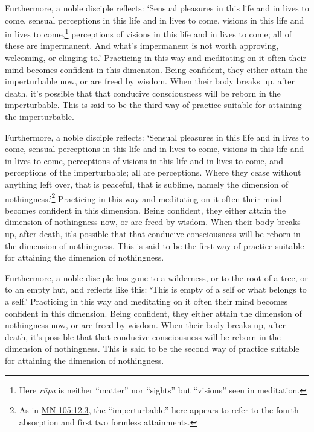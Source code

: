 \documentclass[12pt,openany]{book}%
\begin{document}
Furthermore, a noble disciple reflects: ‘Sensual pleasures in this life and in lives to come, sensual perceptions in this life and in lives to come, visions in this life and in lives to come,\footnote{Here \textit{\textsanskrit{rūpa}} is neither “matter” nor “sights” but “visions” seen in meditation. } perceptions of visions in this life and in lives to come; all of these are impermanent. And what’s impermanent is not worth approving, welcoming, or clinging to.’ Practicing in this way and meditating on it often their mind becomes confident in this dimension. Being confident, they either attain the imperturbable now, or are freed by wisdom. When their body breaks up, after death, it’s possible that that conducive consciousness will be reborn in the imperturbable. This is said to be the third way of practice suitable for attaining the imperturbable. 

Furthermore, a noble disciple reflects: ‘Sensual pleasures in this life and in lives to come, sensual perceptions in this life and in lives to come, visions in this life and in lives to come, perceptions of visions in this life and in lives to come, and perceptions of the imperturbable; all are perceptions. Where they cease without anything left over, that is peaceful, that is sublime, namely the dimension of nothingness.’\footnote{As in \href{https://suttacentral.net/mn105/en/sujato\#12.3}{MN 105:12.3}, the “imperturbable” here appears to refer to the fourth absorption and first two formless attainments. } Practicing in this way and meditating on it often their mind becomes confident in this dimension. Being confident, they either attain the dimension of nothingness now, or are freed by wisdom. When their body breaks up, after death, it’s possible that that conducive consciousness will be reborn in the dimension of nothingness. This is said to be the first way of practice suitable for attaining the dimension of nothingness. 

Furthermore, a noble disciple has gone to a wilderness, or to the root of a tree, or to an empty hut, and reflects like this: ‘This is empty of a self or what belongs to a self.’ Practicing in this way and meditating on it often their mind becomes confident in this dimension. Being confident, they either attain the dimension of nothingness now, or are freed by wisdom. When their body breaks up, after death, it’s possible that that conducive consciousness will be reborn in the dimension of nothingness. This is said to be the second way of practice suitable for attaining the dimension of nothingness. 
\end{document}
